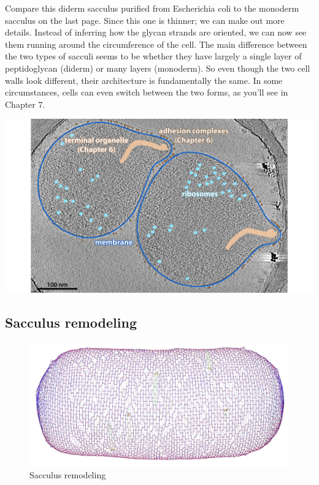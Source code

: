 \documentclass[]{tufte-book}
\begin{document}
Compare this diderm sacculus purified from Escherichia coli to the
monoderm sacculus on the last page. Since this one is thinner; we can
make out more details. Instead of inferring how the glycan strands are
oriented, we can now see them running around the circumference of the
cell. The main difference between the two types of sacculi seems to be
whether they have largely a single layer of peptidoglycan (diderm) or
many layers (monoderm). So even though the two cell walls look
different, their architecture is fundamentally the same. In some
circumstances, cells can even switch between the two forms, as you'll
see in Chapter 7.

\includegraphics{img/02_static/2_1_Mgenitalium}

\subsection{Sacculus remodeling}\label{sacculus-remodeling}

\begin{figure}
\includegraphics{img/02_schematic/2_3_2_SacculusRemodeling} \caption[Sacculus remodeling]{Sacculus remodeling}\label{fig:2-3-2}
\end{figure}
\end{document}
